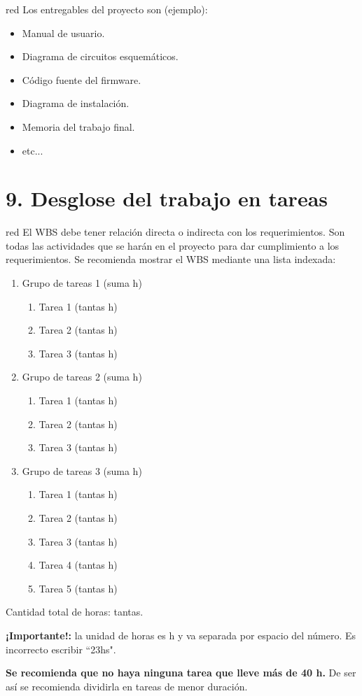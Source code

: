 \documentclass[
11pt, %
]{charter}
\begin{document}
\begin{consigna}{red}
Los entregables del proyecto son (ejemplo):

\begin{itemize}
	\item Manual de usuario.
	\item Diagrama de circuitos esquemáticos.
	\item Código fuente del firmware.
	\item Diagrama de instalación.
	\item Memoria del trabajo final.
	\item etc...
\end{itemize}
\end{consigna}

\section{9. Desglose del trabajo en tareas}
\label{sec:wbs}

\begin{consigna}{red}
El WBS debe tener relación directa o indirecta con los requerimientos.  Son todas las actividades que se harán en el proyecto para dar cumplimiento a los requerimientos. Se recomienda mostrar el WBS mediante una lista indexada:

\begin{enumerate}
\item Grupo de tareas 1 (suma h)
	\begin{enumerate}
	\item Tarea 1 (tantas h)
	\item Tarea 2 (tantas h)
	\item Tarea 3 (tantas h)
	\end{enumerate}
\item Grupo de tareas 2 (suma h)
	\begin{enumerate}
	\item Tarea 1 (tantas h)
	\item Tarea 2 (tantas h)
	\item Tarea 3 (tantas h)
	\end{enumerate}
\item Grupo de tareas 3 (suma h)
	\begin{enumerate}
	\item Tarea 1 (tantas h)
	\item Tarea 2 (tantas h)
	\item Tarea 3 (tantas h)
	\item Tarea 4 (tantas h)
	\item Tarea 5 (tantas h)
	\end{enumerate}
\end{enumerate}

Cantidad total de horas: tantas.

\textbf{¡Importante!:} la unidad de horas es h y va separada por espacio del número. Es incorrecto escribir ``23hs".

\textbf{Se recomienda que no haya ninguna tarea que lleve más de 40 h.} De ser así se recomienda dividirla en tareas de menor duración.

\end{consigna}
\end{document}
